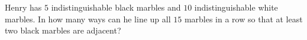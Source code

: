 Henry has $5$ indistinguishable black marbles and $10$ indistinguishable white marbles. In how many ways can he line up all $15$ marbles in a row so that at least two black marbles are adjacent?
